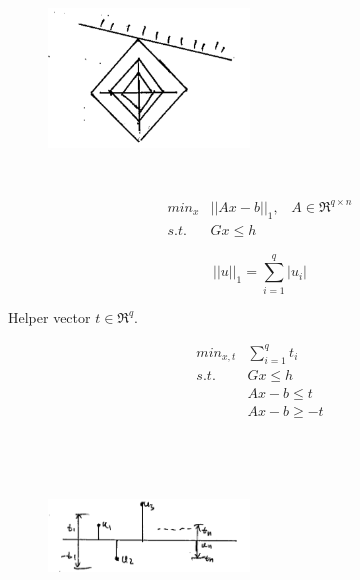 \begin{example}
	\begin{figure}
	\centering
	\includegraphics[width=2.1in,height=2.1in]{figures/ch07/figure1016_3.png}
	\end{figure}
	
	\begin{align*}
	min_x &||Ax - b||_1, \,\,\,\,\, A\in \Re^{q\times n}\\
	s.t. &Gx\leq h
	\end{align*}
	
	\begin{equation*}
	||u||_1 = \sum^q_{i=1} |u_i|
	\end{equation*}
	
	Helper vector $t\in \Re^q$.
	
	\begin{align*}
	min_{x,t} &\sum^q_{i=1}t_i\\
	s.t. \,\,\,\,\,&Gx \leq h\\
	&Ax -b \leq t\\
	&Ax -b \geq -t
	\end{align*}
	
	\begin{figure}
	\centering
	\includegraphics[width=2.1in,height=2.1in]{figures/ch07/figure1016_4.png}
	\end{figure}
\end{example}

